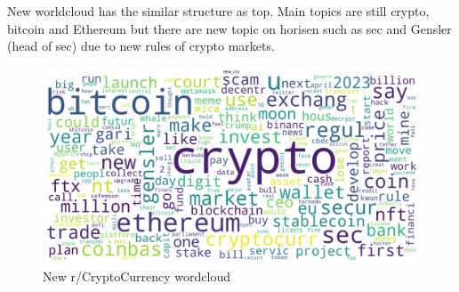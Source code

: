 \begin{landscape}
New worldcloud has the similar structure as top. Main topics are still crypto, bitcoin and Ethereum but there are new topic on horisen such as sec and Gensler (head of sec) due to new rules of crypto markets.

\begin{figure}[H]
\includegraphics[scale=0.55]{img/B1/new_cry_wordcloud.png}
\centering
\caption{New r/CryptoCurrency wordcloud}
\label{fig:new_cry_wordcloud}
\end{figure}
\end{landscape}

